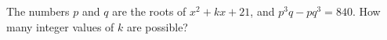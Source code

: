 The numbers $p$ and $q$ are the roots of $x^2+kx+21$, and $p^3q-pq^3=840$. How many integer values of $k$ are possible?
